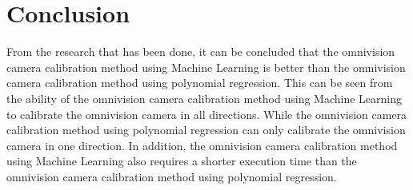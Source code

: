 


\section{Conclusion}
\label{sec:conclusion}

From the research that has been done, it can be concluded that the omnivision camera calibration method using Machine Learning is better than the omnivision camera calibration method using polynomial regression. This can be seen from the ability of the omnivision camera calibration method using Machine Learning to calibrate the omnivision camera in all directions. While the omnivision camera calibration method using polynomial regression can only calibrate the omnivision camera in one direction. In addition, the omnivision camera calibration method using Machine Learning also requires a shorter execution time than the omnivision camera calibration method using polynomial regression.